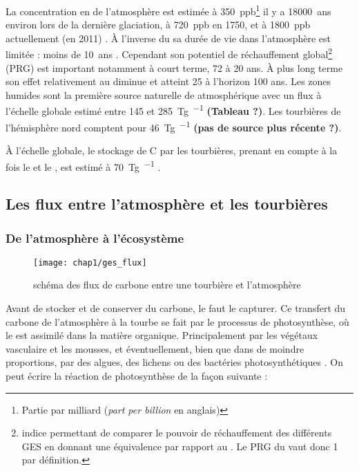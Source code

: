 La concentration en \chh de l'atmosphère est estimée à \SI{350}{ppb}\footnote{Partie par milliard (\textit{part per billion} en anglais)} il y a \SI{18000}{ans} environ lors de la dernière glaciation, à \SI{720}{ppb} en 1750, et à \SI{1800}{ppb} actuellement (en 2011) \citep{Ciais2014}.
À l'inverse du \coo sa durée de vie dans l'atmosphère est limitée : moins de \SI{10}{ans} \citep{lelieveld1998,prather2012}.
Cependant son potentiel de réchauffement global\footnote{indice permettant de comparer le pouvoir de réchauffement des différents GES en donnant une équivalence par rapport au \coo. Le PRG du \coo vaut donc 1 par définition.} (PRG) est important notamment à court terme, 72 à 20 ans.
À plus long terme son effet relativement au \coo diminue et atteint 25 à l'horizon 100 ans.
Les zones humides sont la première source naturelle de \chh atmosphérique avec un flux à l'échelle globale estimé entre \num{145} et \SI{285}{\tera\gram\per\year} \citep{lelieveld1998,wuebbles2002,Ciais2014} \textbf{(Tableau ?)}.
Les tourbières de l'hémisphère nord comptent pour \SI{46}{\tera\gram\per\year} \citep{gorham1991} \textbf{(pas de source plus récente ?)}.


À l'échelle globale, le stockage de C par les tourbières, prenant en compte à la fois le \coo et le \chh, est estimé à \SI{70}{\tera\gram\per\year} \citep{clymo1998}.

\subsection{Les flux entre l'atmosphère et les tourbières}

\subsubsection{De l'atmosphère à l'écosystème}

\begin{figure}
\centering
\texttt{[image: chap1/ges\_flux]}
\caption{schéma des flux de carbone entre une tourbière et l'atmosphère}
\label{fig:ges_flux}
\end{figure}

Avant de stocker et de conserver du carbone, le faut le capturer.
Ce transfert du carbone de l'atmosphère à la tourbe se fait par le processus de photosynthèse, où le \coo est assimilé dans la matière organique.
Principalement par les végétaux vasculaire et les mousses, et éventuellement, bien que dans de moindre proportions, par des algues, des lichens ou des bactéries photosynthétiques \citep{girard2011}.
On peut écrire la réaction de photosynthèse de la façon suivante : 

